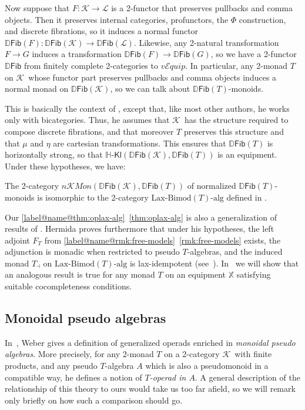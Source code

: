 \documentclass{tac}
\makeatletter
\newcommand{\calK}{\ensuremath{\mathcal{K}}}
\newcommand{\calL}{\ensuremath{\mathcal{L}}}
\newcommand{\maps}{\colon}
\newcommand{\DFib}{\mathbb{D}\mathsf{Fib}}
\newcommand{\nKMon}{\mathit{n}\mathcal{K}\mathit{Mon}}
\newcommand{\vEquip}{\ensuremath{\mathit{v}\mathcal{E}\!\mathit{quip}}}
\newcommand{\Hkl}[2]{\mathbb{H}\text{-}\mathsf{Kl}(\mathbb{#1},#2)}
\numberwithin{equation}{section}
\def\currthmtype{}
\def\autoref#1{\ref*{label@name@#1}~\ref{#1}}
\def\autoref#1{\ref{label@name@#1}~\ref{#1}}
\let\old@label\label
\def\label#1{%
    {\let\your@currentlabel\@currentlabel%
      \edef\@currentlabel{\currthmtype}%
      \old@label{label@name@#1}}%
    \old@label{#1}}
\makeatother
\begin{document}
Now suppose that $F\maps \calK\to\calL$ is a 2-functor that preserves
pullbacks and comma objects.  Then it preserves internal categories,
profunctors, the $\Phi$ construction, and discrete fibrations, so it
induces a normal functor $\DFib(F)\maps
\DFib(\calK)\to\DFib(\calL)$. Likewise, any 2-natural transformation
$F\to G$ induces a transformation $\DFib(F)\to\DFib(G)$, so we have a
2-functor $\DFib$ from finitely complete 2-categories to $\vEquip$.
In particular, any 2-monad $T$ on \calK\ whose functor part preserves
pullbacks and comma objects induces a normal monad on $\DFib(\calK)$,
so we can talk about $\DFib(T)$-monoids.

This is basically the context of \cite{HermidaCoherent}, except that,
like most other authors, he works only with bicategories.  Thus, he assumes that
\calK\ has the structure required to compose discrete fibrations, and
that moreover $T$ preserves this structure and that $\mu$ and $\eta$
are cartesian transformations.  This ensures that $\DFib(T)$ is
horizontally strong, so that $\Hkl{\DFib(\calK)}{\DFib(T)}$ is an
equipment.  Under these hypotheses, we have:

\begin{theorem}
  The 2-category $\nKMon(\DFib(\calK),\DFib(T))$ of normalized
  $\DFib(T)$-monoids is isomorphic to the 2-category
  $\mbox{Lax-Bimod}(T)\mbox{-alg}$ defined in \cite[4.3 and
  4.4]{HermidaCoherent}.
\end{theorem}

Our \autoref{thm:oplax-alg} is also a generalization of results of
\cite{HermidaCoherent}.  Hermida proves furthermore that under his
hypotheses, the left adjoint $F_T$ from \autoref{rmk:free-models}
exists, the adjunction is monadic when restricted to pseudo
$T$-algebras, and the induced monad $T_\dashv$ on
$\mbox{Lax-Bimod}(T)\mbox{-alg}$ is lax-idempotent
(see~\cite{kl:property-like}).  In~\cite{cs:laxidem} we will show that
an analogous result is true for any monad $T$ on an equipment
$\mathbb{X}$ satisfying suitable cocompleteness conditions.


\subsection{Monoidal pseudo algebras}
\label{sec:mon-psalg}

In~\cite{weber:operads}, Weber gives a definition of generalized
operads enriched in \emph{monoidal pseudo algebras}.  More precisely,
for any 2-monad $T$ on a 2-category \calK\ with finite products, and
any pseudo $T$-algebra $A$ which is also a pseudomonoid in a
compatible way, he defines a notion of \emph{$T$-operad in $A$}.
A general description of the relationship of this theory to ours would
take us too far afield, so we will remark only briefly on how such a
comparison should go.
\end{document}
